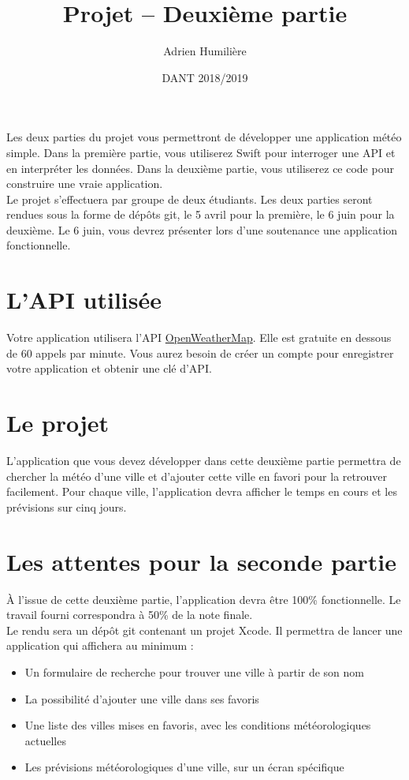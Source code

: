 \documentclass[a4paper,11pt]{scrartcl}
\begin{document}
\newcommand{\mytitle}{\textsf{\textbf{Projet – Deuxième partie}}}
\title{\mytitle}
\author{Adrien Humilière}
\date{DANT 2018/2019}

\maketitle

Les deux parties du projet vous permettront de développer une application météo simple. Dans la première partie, vous utiliserez Swift pour interroger une API et en interpréter les données. Dans la deuxième partie, vous utiliserez ce code pour construire une vraie application.\\

Le projet s'effectuera par groupe de deux étudiants. Les deux parties seront rendues sous la forme de dépôts git, le 5 avril pour la première, le 6 juin pour la deuxième. Le 6 juin, vous devrez présenter lors d'une soutenance une application fonctionnelle.

\section*{L'API utilisée}

Votre application utilisera l'API \href{https://openweathermap.org/api}{OpenWeatherMap}. Elle est gratuite en dessous de 60 appels par minute. Vous aurez besoin de créer un compte pour enregistrer votre application et obtenir une clé d'API. 

\section*{Le projet}

L'application que vous devez développer dans cette deuxième partie permettra de chercher la météo d'une ville et d'ajouter cette ville en favori pour la retrouver facilement. Pour chaque ville, l'application devra afficher le temps en cours et les prévisions sur cinq jours.

\section*{Les attentes pour la seconde partie}

À l'issue de cette deuxième partie, l'application devra être 100\% fonctionnelle. Le travail fourni correspondra à 50\% de la note finale.\\

Le rendu sera un dépôt git contenant un projet Xcode. Il permettra de lancer une application qui affichera au minimum :
\begin{itemize}
\item Un formulaire de recherche pour trouver une ville à partir de son nom
\item La possibilité d'ajouter une ville dans ses favoris
\item Une liste des villes mises en favoris, avec les conditions météorologiques actuelles
\item Les prévisions météorologiques d'une ville, sur un écran spécifique
\end{itemize}
\end{document}
